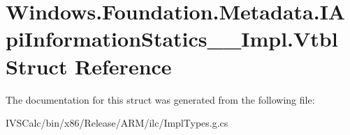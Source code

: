 \hypertarget{struct_windows_1_1_foundation_1_1_metadata_1_1_i_api_information_statics_____impl_1_1_vtbl}{}\section{Windows.\+Foundation.\+Metadata.\+I\+Api\+Information\+Statics\+\_\+\+\_\+\+Impl.\+Vtbl Struct Reference}
\label{struct_windows_1_1_foundation_1_1_metadata_1_1_i_api_information_statics_____impl_1_1_vtbl}


The documentation for this struct was generated from the following file\+:\begin{DoxyCompactItemize}
\item 
I\+V\+S\+Calc/bin/x86/\+Release/\+A\+R\+M/ilc/Impl\+Types.\+g.\+cs\end{DoxyCompactItemize}
